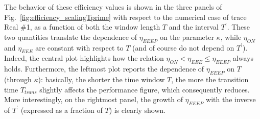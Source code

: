 \documentclass[journal,10pt,twoside,final]{IEEEtran}
\begin{document}
The behavior of these efficiency values is shown in the three panels of Fig.~\ref{fig:efficiency_scalingTprime} with respect to the numerical case of trace Real \#1, as a function of both the window length $T$ and the interval $T^\prime$. 
These two quantities translate the dependence of $\eta_{EEEP}$ on the parameter $\kappa$, while $\eta_{ON}$ and $\eta_{EEE}$ are constant with respect to $T$ (and of course do not depend on $T^\prime$). Indeed, the central plot highlights how the relation $\eta_{ON}<\eta_{EEE}\le\eta_{EEEP}$ always holds.
Furthermore, the leftmost plot reports the dependence of  $\eta_{EEEP}$ on $T$ (through $\kappa$): basically, the shorter the time window $T$, the more the transition time $T_{trans}$ slightly affects the performance figure, which consequently reduces.
More interestingly, on the rightmost panel, the growth of $\eta_{EEEP}$ with the inverse of $T^\prime$ (expressed as a fraction of $T$) is clearly shown. 

\begin{figure*}[ht!]
\centering

\vspace{0.0cm}
\caption{Trace Real \#1. Efficiency comparison among different transmission strategies. The Always-On (ON), the EEE and the EEEP strategies are compared in terms of $\eta$, and shown respectively in dark gray, gray, and light gray. When considering the EEEP policy, different values for $T^\prime$ are shown.}
\label{fig:efficiency_scalingTprime}
\end{figure*}
\end{document}
